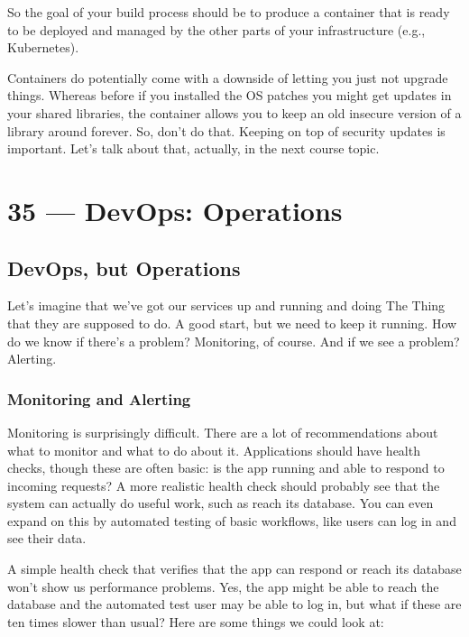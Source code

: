 \documentclass[a4paper]{report}
\begin{document}
So the goal of your build process should be to produce a container that is ready to be deployed and managed by the other parts of your infrastructure (e.g., Kubernetes). 

Containers do potentially come with a downside of letting you just not upgrade things. Whereas before if you installed the OS patches you might get updates in your shared libraries, the container allows you to keep an old insecure version of a library around forever. So, don't do that. Keeping on top of security updates is important. Let's talk about that, actually, in the next course topic.









\chapter*{35 --- DevOps: Operations}


\section*{DevOps, but Operations}

Let's imagine that we've got our services up and running and doing The Thing that they are supposed to do. A good start, but we need to keep it running. How do we know if there's a problem? Monitoring, of course. And if we see a problem? Alerting.

\subsection*{Monitoring and Alerting}

Monitoring is surprisingly difficult. There are a lot of recommendations about what to monitor and what to do about it. Applications should have health checks, though these are often basic: is the app running and able to respond to incoming requests? A more realistic health check should probably see that the system can actually do useful work, such as reach its database. You can even expand on this by automated testing of basic workflows, like users can log in and see their data.

A simple health check that verifies that the app can respond or reach its database won't show us performance problems. Yes, the app might be able to reach the database and the automated test user may be able to log in, but what if these are ten times slower than usual? Here are some things we could look at:
\end{document}
